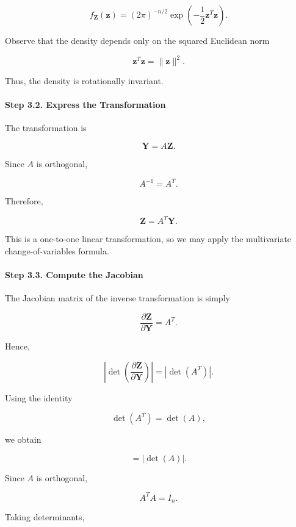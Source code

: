 \documentclass[11pt]{article}
\begin{document}
\begin{mdframed}[
		linewidth=0.8pt,
		roundcorner=6pt,
		backgroundcolor=gray!5,
		linecolor=gray!60,
		innertopmargin=10pt,
		innerbottommargin=10pt,
		innerleftmargin=10pt,
		innerrightmargin=10pt
		]
		\[
		f_{\mathbf Z}(\mathbf z)
		=
		(2\pi)^{-n/2}
		\exp
		\left(
		-\frac12
		\mathbf z^T\mathbf z
		\right).
		\]
		
		Observe that the density depends only on the squared Euclidean norm
		
		\[
		\mathbf z^T\mathbf z
		=
		\|\mathbf z\|^2.
		\]
		
		Thus, the density is rotationally invariant.
		
		\vspace{0.3cm}
		
		\paragraph{Step 3.2. Express the Transformation}
		
		The transformation is
		
		\[
		\mathbf Y=A\mathbf Z.
		\]
		
		Since $A$ is orthogonal,
		
		\[
		A^{-1}=A^T.
		\]
		
		Therefore,
		
		\[
		\boxed{
			\mathbf Z
			=
			A^T\mathbf Y.
		}
		\]
		
		This is a one-to-one linear transformation, so we may apply the
		multivariate change-of-variables formula.
		
		\vspace{0.3cm}
		
		\paragraph{Step 3.3. Compute the Jacobian}
		
		The Jacobian matrix of the inverse transformation is simply
		
		\[
		\frac{\partial\mathbf Z}{\partial\mathbf Y}
		=
		A^T.
		\]
		
		Hence,
		
		\[
		\left|
		\det
		\left(
		\frac{\partial\mathbf Z}
		{\partial\mathbf Y}
		\right)
		\right|
		=
		|\det(A^T)|.
		\]
		
		Using the identity
		
		\[
		\det(A^T)=\det(A),
		\]
		
		we obtain
		
		\[
		=
		|\det(A)|.
		\]
		
		Since $A$ is orthogonal,
		
		\[
		A^TA=I_n.
		\]
		
		Taking determinants,
		

\end{mdframed}
\end{document}
